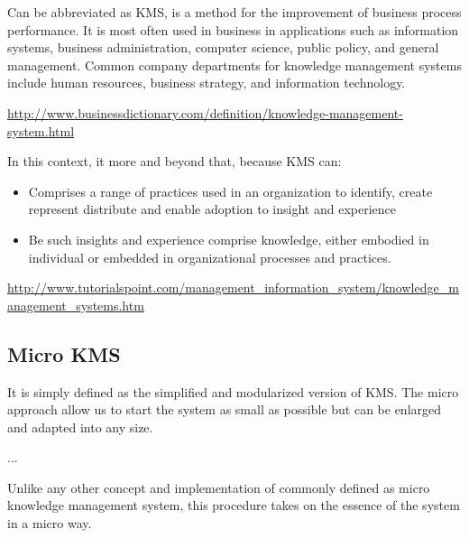 Can be abbreviated as KMS, is a method for the improvement of business process performance. It is most often used in business in applications such as information systems, business administration, computer science, public policy, and general management. Common company departments for knowledge management systems include human resources, business strategy, and information technology.

\url{http://www.businessdictionary.com/definition/knowledge-management-system.html}

In this context, it more and beyond that, because KMS can:

\begin{itemize}
  \item Comprises a range of practices used in an organization to identify, create represent distribute and enable adoption to insight and experience
  \item Be such insights and experience comprise knowledge, either embodied in individual or embedded in organizational processes and practices.
\end{itemize}

\url{http://www.tutorialspoint.com/management_information_system/knowledge_management_systems.htm}

\subsection{Micro {KMS}}

It is simply defined as the simplified and modularized version of KMS.
The micro approach allow us to start the system as small as possible but can be enlarged and adapted into any size.

...

Unlike any other concept and implementation of commonly defined as micro knowledge management system, this procedure takes on the essence of the system in a micro way.

